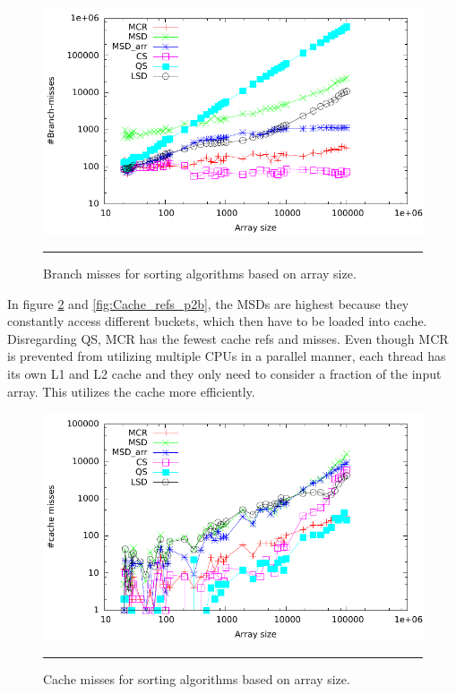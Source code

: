 \begin{figure}[htbp]
	\centering
		\includegraphics[width=\textwidth]{./Figures/Project2b/Branch_misses.pdf}
		\rule{35em}{0.5pt}
	\caption[Branch misses]{
	Branch misses for sorting algorithms based on array size.
	}
	\label{fig:Branch_misses_p2b}
\end{figure}


In figure \ref{fig:Cache_misses_p2b} and \ref{fig:Cache_refs_p2b}, the MSDs are highest because they constantly access different buckets, which then have to be loaded into cache.
Disregarding QS, MCR has the fewest cache refs and misses. Even though MCR is prevented from utilizing multiple CPUs in a parallel manner, each thread has its own L1 and L2 cache and they only need to consider a fraction of the input array.
This utilizes the cache more efficiently.

\begin{figure}[htbp]
	\centering
		\includegraphics[width=\textwidth]{./Figures/Project2b/Cache_misses.pdf}
		\rule{35em}{0.5pt}
	\caption[Cache misses]{
	Cache misses for sorting algorithms based on array size.
	}
	\label{fig:Cache_misses_p2b}
\end{figure}

